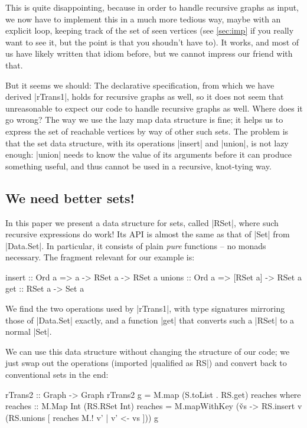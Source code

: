 \documentclass[manuscript,anonymous,screen,acmsmall]{acmart}
\begin{document}
This is quite disappointing, because in order to handle recursive graphs as input, we now have to implement this in a much more tedious way, maybe with an explicit loop, keeping track of the set of seen vertices (see \cref{sec:imp} if you really want to see it, but the point is that you shoudn’t have to). It works, and most of us have likely written that idiom before, but we cannot impress our friend with that.

But it seems we should: The declarative specification, from which we have derived |rTrans1|, holds for recursive graphs as well, so it does not seem that unreasonable to expect our code to handle recursive graphs as well. Where does it go wrong? The way we use the lazy map data structure is fine; it helps us to express the set of reachable vertices by way of other such sets.
The problem is that the set data structure, with its operations |insert| and |union|, is not lazy enough: |union| needs to know the value of its arguments before it can produce something useful, and thus cannot be used in a recursive, knot-tying way.

\subsection{We need better sets!}

In this paper we present a data structure for sets, called |RSet|, where such recursive expressions do work! Its API is almost the same as that of |Set| from |Data.Set|. In particular, it consists of plain \emph{pure} functions -- no monads necessary. The fragment relevant for our example is:
\begin{code}
insert  :: Ord a =>  a -> RSet a  -> RSet a
unions  :: Ord a =>  [RSet a]     -> RSet a
get     ::           RSet a       -> Set a
\end{code}
We find the two operations used by |rTrans1|, with type signatures mirroring those of |Data.Set| exactly, and a function |get| that converts such a |RSet| to a normal |Set|.

We can use this data structure without changing the structure of our code; we just swap out the operations (imported |qualified as RS|) and convert back to conventional sets in the end:
\begin{code}
rTrans2 :: Graph -> Graph
rTrans2 g = M.map (S.toList . RS.get) reaches
  where
    reaches :: M.Map Int (RS.RSet Int)
    reaches = M.mapWithKey (\v vs -> RS.insert v (RS.unions [ reaches M.! v' | v' <- vs ])) g
\end{code}
\end{document}
